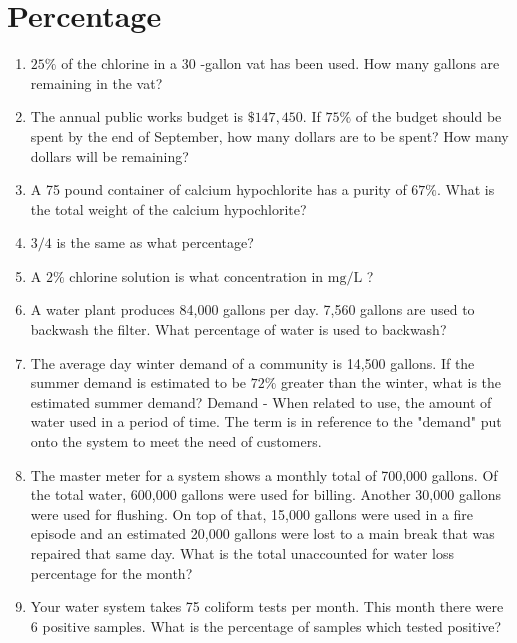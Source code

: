 \documentclass{article}
\begin{document}
\section{Percentage}
\begin{enumerate}
\item $25 \%$ of the chlorine in a 30 -gallon vat has been used. How many gallons are remaining in the vat?

\item The annual public works budget is $\$ 147,450$. If $75 \%$ of the budget should be spent by the end of September, how many dollars are to be spent? How many dollars will be remaining?

\item A 75 pound container of calcium hypochlorite has a purity of $67 \%$. What is the total weight of the calcium hypochlorite? 

\item $3 / 4$ is the same as what percentage?

\item A $2 \%$ chlorine solution is what concentration in $\mathrm{mg} / \mathrm{L}$ ?

\item A water plant produces 84,000 gallons per day. 7,560 gallons are used to backwash the filter. What percentage of water is used to backwash?

\item The average day winter demand of a community is 14,500 gallons. If the summer demand is estimated to be $72 \%$ greater than the winter, what is the estimated summer demand? Demand - When related to use, the amount of water used in a period of time. The term is in reference to the "demand" put onto the system to meet the need of customers.

\item The master meter for a system shows a monthly total of 700,000 gallons. Of the total water, 600,000 gallons were used for billing. Another 30,000 gallons were used for flushing. On top of that, 15,000 gallons were used in a fire episode and an estimated 20,000 gallons were lost to a main break that was repaired that same day. What is the total unaccounted for water loss percentage for the month?

\item Your water system takes 75 coliform tests per month. This month there were 6 positive samples. What is the percentage of samples which tested positive?
\end{enumerate}
\end{document}
